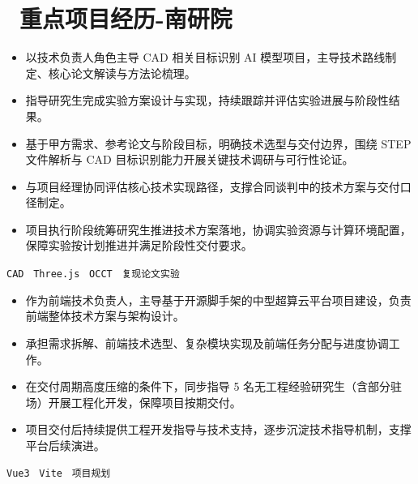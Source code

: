 \documentclass{resume}
\begin{document}

\section{\faUsers\ 重点项目经历-南研院}


\begin{itemize}
  \item 以技术负责人角色主导 CAD 相关目标识别 AI 模型项目，主导技术路线制定、核心论文解读与方法论梳理。
  \item 指导研究生完成实验方案设计与实现，持续跟踪并评估实验进展与阶段性结果。
  \item 基于甲方需求、参考论文与阶段目标，明确技术选型与交付边界，围绕 STEP 文件解析与 CAD 目标识别能力开展关键技术调研与可行性论证。
  \item 与项目经理协同评估核心技术实现路径，支撑合同谈判中的技术方案与交付口径制定。
  \item 项目执行阶段统筹研究生推进技术方案落地，协调实验资源与计算环境配置，保障实验按计划推进并满足阶段性交付要求。
\end{itemize}

\vspace{0.3em}
\texttt{CAD} \textperiodcentered\
\texttt{Three.js} \textperiodcentered\
\texttt{OCCT} \textperiodcentered\
\texttt{复现论文实验}

\role{前端技术负责人}{}

\begin{itemize}
  \item 作为前端技术负责人，主导基于开源脚手架的中型超算云平台项目建设，负责前端整体技术方案与架构设计。
  \item 承担需求拆解、前端技术选型、复杂模块实现及前端任务分配与进度协调工作。
  \item 在交付周期高度压缩的条件下，同步指导 5 名无工程经验研究生（含部分驻场）开展工程化开发，保障项目按期交付。
  \item 项目交付后持续提供工程开发指导与技术支持，逐步沉淀技术指导机制，支撑平台后续演进。
\end{itemize}

\vspace{0.3em}
\texttt{Vue3} \textperiodcentered\
\texttt{Vite} \textperiodcentered\
\texttt{项目规划}
\end{document}
